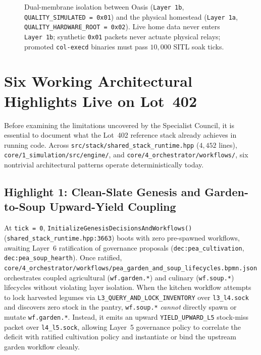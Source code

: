 \begin{figure}[htbp]
{%
}
\caption{Dual-membrane isolation between Oasis (\texttt{Layer 1b}, \texttt{QUALITY\_SIMULATED = 0x01}) and the physical homestead (\texttt{Layer 1a}, \texttt{QUALITY\_HARDWARE\_ROOT = 0x02}). Live home data never enters \texttt{Layer 1b}; synthetic \texttt{0x01} packets never actuate physical relays; promoted \texttt{col-execd} binaries must pass $10{,}000$ SITL soak ticks.}
\label{fig:dual-membrane-airgap}
\end{figure}

\section{Six Working Architectural Highlights Live on Lot~402}
\label{sec:six-oasis-highlights}

Before examining the limitations uncovered by the Specialist Council, it is essential to document what the Lot~402 reference stack already achieves in running code. Across \texttt{src/stack/shared\_stack\_runtime.hpp} ($4{,}452$ lines), \texttt{core/1\_simulation/src/engine/}, and \texttt{core/4\_orchestrator/workflows/}, six nontrivial architectural patterns operate deterministically today.

\subsection{Highlight 1: Clean-Slate Genesis and Garden-to-Soup Upward-Yield Coupling}

At \texttt{tick = 0}, \texttt{InitializeGenesisDecisionsAndWorkflows()} (\texttt{shared\_stack\_runtime.hpp:3663}) boots with zero pre-spawned workflows, awaiting Layer~6 ratification of governance proposals (\texttt{dec:pea\_cultivation}, \texttt{dec:pea\_soup\_hearth}). Once ratified, \texttt{core/4\_orchestrator/workflows/pea\_garden\_and\_soup\_lifecycles.bpmn.json} orchestrates coupled agricultural (\texttt{wf.garden.*}) and culinary (\texttt{wf.soup.*}) lifecycles without violating layer isolation. When the kitchen workflow attempts to lock harvested legumes via \texttt{L3\_QUERY\_AND\_LOCK\_INVENTORY} over \texttt{l3\_l4.sock} and discovers zero stock in the pantry, \texttt{wf.soup.*} \emph{cannot} directly spawn or mutate \texttt{wf.garden.*}. Instead, it emits an upward \texttt{YIELD\_UPWARD\_L5} stock-miss packet over \texttt{l4\_l5.sock}, allowing Layer~5 governance policy to correlate the deficit with ratified cultivation policy and instantiate or bind the upstream garden workflow cleanly.

